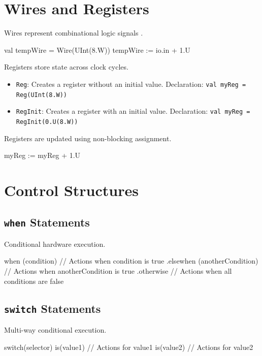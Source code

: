 \section{Wires and Registers}
Wires represent combinational logic signals \cite{chisel-doc}.
\begin{chiselcode}
val tempWire = Wire(UInt(8.W))
tempWire := io.in + 1.U    
\end{chiselcode}

Registers store state across clock cycles.
\begin{itemize}
    \item \texttt{Reg}: Creates a register without an initial value.
        \newline Declaration: \texttt{val myReg = Reg(UInt(8.W))}
    \item \texttt{RegInit}: Creates a register with an initial value.
        \newline Declaration: \texttt{val myReg = RegInit(0.U(8.W))}
\end{itemize}

Registers are updated using non-blocking assignment.
\begin{chiselcode}
myReg := myReg + 1.U    
\end{chiselcode}

\section{Control Structures}

\subsection{\texttt{when} Statements}
Conditional hardware execution.
\begin{chiselcode}
when (condition) {
  // Actions when condition is true
} .elsewhen (anotherCondition) {
  // Actions when anotherCondition is true
} .otherwise {
  // Actions when all conditions are false
}
\end{chiselcode}

\subsection{\texttt{switch} Statements}
Multi-way conditional execution.
\begin{chiselcode}
switch(selector) {
  is(value1) {
    // Actions for value1
  }
  is(value2) {
    // Actions for value2
  }
}
\end{chiselcode}

